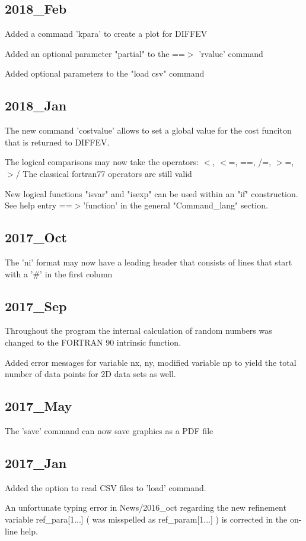 \subsection*{2018\_Feb}
\par
Added a command 'kpara' to create a plot for DIFFEV 
\par
Added an optional parameter "partial" to the ==$> $ 'rvalue' command 
\par
Added optional parameters to the "load csv" command 
\subsection*{2018\_Jan}
\par
The new command 'costvalue' allows to set a global value 
for the cost funciton that is returned to DIFFEV. 
\par
The logical comparisons may now take the operators: 
$ <$, $ <$=, ==, /=, $> $=, $> $/ 
The classical fortran77 operators are still valid 
\par
New logical functions "isvar" and "isexp" can be used within an 
"if" construction. See help entry ==$> $'function' in the 
general "Command\_lang" section. 
\subsection*{2017\_Oct}
\par
The 'ni' format may now have a leading header that consists of 
lines that start with a '\#' in the first column 
\subsection*{2017\_Sep}
\par
Throughout the program the internal calculation of random numbers 
was changed to the FORTRAN 90 intrinsic function. 
\par
Added error messages for variable nx, ny, modified variable np to 
yield the total number of data points for 2D data sets as well. 
\subsection*{2017\_May}
\par
The 'save' command can now save graphics as a PDF file 
\subsection*{2017\_Jan}
\par
Added the option to read CSV files to 'load' command. 
\par
An unfortunate typing error in News/2016\_oct regarding the new 
refinement variable 
ref\_para[1...]   ( was misspelled as ref\_param[1...] ) 
is corrected in the  on-line help. 
